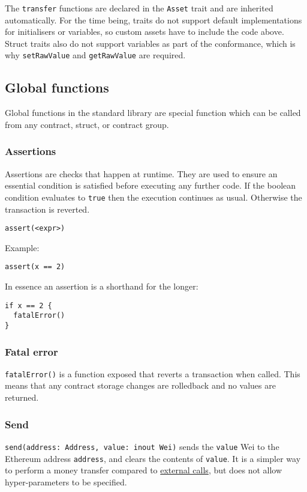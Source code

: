 The \texttt{transfer} functions are declared in the \texttt{Asset} trait and are inherited automatically. For the time being, traits do not support default implementations for initialisers or variables, so custom assets have to include the code above. Struct traits also do not support variables as part of the conformance, which is why \texttt{setRawValue} and \texttt{getRawValue} are required.

\subsection{Global functions}
\label{sec:appendix-b-global-functions}

Global functions in the standard library are special function which can be called from any contract, struct, or contract group.

\subsubsection{Assertions}
\label{sec:appendix-b-assertions}

Assertions are checks that happen at runtime. They are used to ensure an essential condition is satisfied before executing any further code. If the boolean condition evaluates to \texttt{true} then the execution continues as usual. Otherwise the transaction is reverted.

\begin{verbatim}
assert(<expr>)
\end{verbatim}

Example:

\begin{verbatim}
assert(x == 2)
\end{verbatim}

In essence an assertion is a shorthand for the longer:

\begin{verbatim}
if x == 2 {
  fatalError()
}
\end{verbatim}

\subsubsection{Fatal error}
\label{sec:appendix-b-fatal-error}

\texttt{fatalError()} is a function exposed that reverts a transaction when called. This means that any contract storage changes are rolledback and no values are returned.

\subsubsection{Send}
\label{sec:appendix-b-send}

\texttt{send(address: Address, value: inout Wei)} sends the \texttt{value} Wei to the Ethereum address \texttt{address}, and clears the contents of \texttt{value}. It is a simpler way to perform a money transfer compared to \hyperref[sec:appendix-b-external-calls]{external calls}, but does not allow hyper-parameters to be specified.

